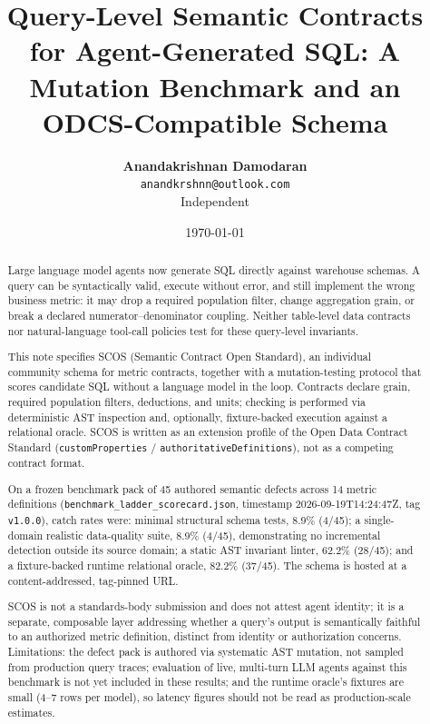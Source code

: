 \documentclass[11pt,a4paper]{article}
\title{\textbf{Query-Level Semantic Contracts for Agent-Generated SQL: A Mutation Benchmark and an ODCS-Compatible Schema}}
\author{
  \textbf{Anandakrishnan Damodaran} \\
  \texttt{anandkrshnn@outlook.com} \\
  \small Independent
}
\date{\today}
\begin{document}
\maketitle

\begin{abstract}
Large language model agents now generate SQL directly against warehouse schemas. A query can be syntactically valid, execute without error, and still implement the wrong business metric: it may drop a required population filter, change aggregation grain, or break a declared numerator--denominator coupling. Neither table-level data contracts nor natural-language tool-call policies test for these query-level invariants.

This note specifies SCOS (Semantic Contract Open Standard), an individual community schema for metric contracts, together with a mutation-testing protocol that scores candidate SQL without a language model in the loop. Contracts declare grain, required population filters, deductions, and units; checking is performed via deterministic AST inspection and, optionally, fixture-backed execution against a relational oracle. SCOS is written as an extension profile of the Open Data Contract Standard (\texttt{customProperties} / \texttt{authoritativeDefinitions}), not as a competing contract format.

On a frozen benchmark pack of 45 authored semantic defects across 14 metric definitions (\texttt{benchmark\_ladder\_scorecard.json}, timestamp 2026-09-19T14:24:47Z, tag \texttt{v1.0.0}), catch rates were: minimal structural schema tests, 8.9\% (4/45); a single-domain realistic data-quality suite, 8.9\% (4/45), demonstrating no incremental detection outside its source domain; a static AST invariant linter, 62.2\% (28/45); and a fixture-backed runtime relational oracle, 82.2\% (37/45). The schema is hosted at a content-addressed, tag-pinned URL.

SCOS is not a standards-body submission and does not attest agent identity; it is a separate, composable layer addressing whether a query's output is semantically faithful to an authorized metric definition, distinct from identity or authorization concerns. Limitations: the defect pack is authored via systematic AST mutation, not sampled from production query traces; evaluation of live, multi-turn LLM agents against this benchmark is not yet included in these results; and the runtime oracle's fixtures are small (4--7 rows per model), so latency figures should not be read as production-scale estimates.
\end{abstract}
\end{document}
